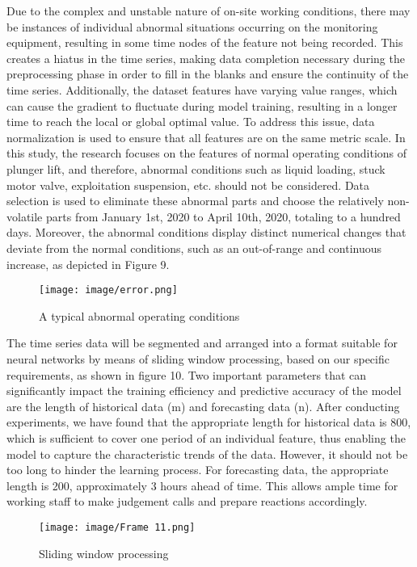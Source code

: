 \documentclass[sn-mathphys,Numbered]{sn-jnl}%
\theoremstyle{thmstyleone}%
\theoremstyle{thmstyletwo}%
\theoremstyle{thmstylethree}%
\begin{document}
Due to the complex and unstable nature of on-site working conditions, there may be instances of individual abnormal situations occurring on the monitoring equipment, resulting in some time nodes of the feature not being recorded. This creates a hiatus in the time series, making data completion necessary during the preprocessing phase in order to fill in the blanks and ensure the continuity of the time series. Additionally, the dataset features have varying value ranges, which can cause the gradient to fluctuate during model training, resulting in a longer time to reach the local or global optimal value. To address this issue, data normalization is used to ensure that all features are on the same metric scale. In this study, the research focuses on the features of normal operating conditions of plunger lift, and therefore, abnormal conditions such as liquid loading, stuck motor valve, exploitation suspension, etc. should not be considered. Data selection is used to eliminate these abnormal parts and choose the relatively non-volatile parts from January 1st, 2020 to April 10th, 2020, totaling to a hundred days. Moreover, the abnormal conditions display distinct numerical changes that deviate from the normal conditions, such as an out-of-range and continuous increase, as depicted in Figure 9.

\begin{figure}[htp]
    \centering
    \texttt{[image: image/error.png]}
    \caption{\centering  A typical abnormal operating conditions}
    \label{fig:abnormal}
\end{figure}

The time series data will be segmented and arranged into a format suitable for neural networks by means of sliding window processing, based on our specific requirements, as shown in figure 10. Two important parameters that can significantly impact the training efficiency and predictive accuracy of the model are the length of historical data (m) and forecasting data (n). After conducting experiments, we have found that the appropriate length for historical data is 800, which is sufficient to cover one period of an individual feature, thus enabling the model to capture the characteristic trends of the data. However, it should not be too long to hinder the learning process. For forecasting data, the appropriate length is 200, approximately 3 hours ahead of time. This allows ample time for working staff to make judgement calls and prepare reactions accordingly.

\begin{figure}[htp]
    \centering
    \texttt{[image: image/Frame 11.png]}
    \caption{\centering  Sliding window processing}
    \label{fig:window}
\end{figure}
\end{document}
